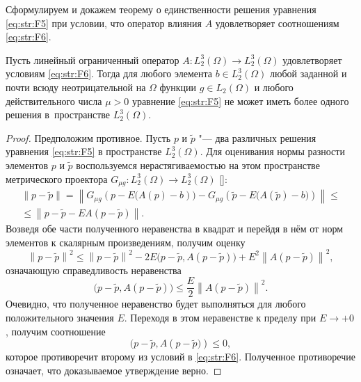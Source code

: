 Сформулируем и докажем теорему о единственности решения уравнения \eqref{eq:str:F5} при условии, что оператор влияния $A$ удовлетворяет соотношениям \eqref{eq:str:F6}.

\smallskip

\hypertarget{str:th1}{}

\begin{theorem}[1]Пусть линейный ограниченный оператор $A\colon L_{2}^{3} (\Omega)\to L_{2}^{3} (\Omega)$ удовлетворяет условиям \eqref{eq:str:F6}$.$
Тогда для любого элемента $b\in L_{2}^{3} (\Omega)$ любой заданной и почти всюду неотрицательной на $\Omega $ функции $g\in L_{2} (\Omega)$ и любого действительного числа $\mu >0$ уравнение \eqref{eq:str:F5} не может иметь более одного решения в~пространстве $L_{2}^{3} (\Omega).$
\end{theorem}

\smallskip


\begin{proof} Предположим противное.
Пусть $p$ и $\tilde{p}$ "--- два различных решения уравнения \eqref{eq:str:F5} в пространстве $L_{2}^{3} (\Omega)$.
Для оценивания нормы разности элементов $p$ и $\tilde{p}$ воспользуемся нерастягиваемостью на этом пространстве метрического проектора $G_{\mu g} \colon L_{2}^{3} (\Omega)\to L_{2}^{3} (\Omega)$ []:
\begin{multline*} 
\left\| p-\tilde{p}\right\| = \left\| G_{\mu g} \left(p-E  \bigl(A(p)-b\right)\bigr)-G_{\mu g} \left(\tilde{p}-E  \bigl(A\left(\tilde{p}\right)-b\bigr)\right)\right\| \le  \\ \le \left\| p-\tilde{p}-E  A\left(p-\tilde{p}\right)\right\|.
 \end{multline*}
Возведя обе части полученного неравенства в квадрат и перейдя в нём от норм элементов к скалярным произведениям, получим оценку
$$\left\| p-\tilde{p}\right\| ^{2} \le \left\| p-\tilde{p}\right\| ^{2} -2E  \bigl(p-\tilde{p},A\left(p-\tilde{p}\right)\bigr)+E^{2} \left\| A\left(p-\tilde{p}\right)\right\| ^{2} ,$$ 
означающую справедливость неравенства
$$
\bigl(p-\tilde{p},A\left(p-\tilde{p}\right)\bigr)\le \frac{E}{2} \left\| A\left(p-\tilde{p}\right)\right\| ^{2} .
$$
Очевидно, что полученное неравенство будет выполняться для любого положительного значения $E$.
Переходя в этом неравенстве к пределу при $E\to +0$, получим соотношение
$$\bigl(p-\tilde{p},A\left(p-\tilde{p}\bigr)\right)\le 0,$$
которое противоречит второму из условий в \eqref{eq:str:F6}.
Полученное противоречие означает, что доказываемое утверждение верно.
\end{proof}

